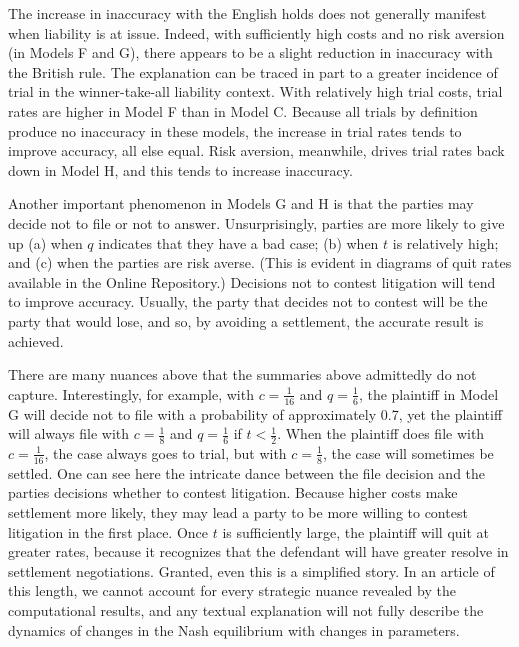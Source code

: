 \documentclass{article}
\begin{document}
The increase in inaccuracy with the English holds does not generally manifest when liability is at issue. Indeed, with sufficiently high costs and no risk aversion (in Models F and G), there appears to be a slight reduction in inaccuracy with the British rule. The explanation can be traced in part to a greater incidence of trial in the winner-take-all liability context. With relatively high trial costs, trial rates are higher in Model F than in Model C.  Because all trials by definition produce no inaccuracy in these models, the increase in trial rates tends to improve accuracy, all else equal. Risk aversion, meanwhile, drives trial rates back down in Model H, and this tends to increase inaccuracy. 

Another important phenomenon in Models G and H is that the parties may decide not to file or not to answer. Unsurprisingly, parties are more likely to give up (a) when $q$ indicates that they have a bad case; (b) when $t$ is relatively high; and (c) when the parties are risk averse. (This is evident in diagrams of quit rates available in the Online Repository.) Decisions not to contest litigation will tend to improve accuracy. Usually, the party that decides not to contest will be the party that would lose, and so, by avoiding a settlement, the accurate result is achieved.

There are many nuances above that the summaries above admittedly do not capture. Interestingly, for example, with $c = \frac{1}{16}$ and $q = \frac{1}{6}$, the plaintiff in Model G will decide not to file with a probability of approximately 0.7, yet the plaintiff will always file with $c = \frac{1}{8}$ and $q = \frac{1}{6}$ if $t < \frac{1}{2}$. When the plaintiff does file with $c = \frac{1}{16}$, the case always goes to trial, but with $c = \frac{1}{8}$, the case will sometimes be settled. One can see here the intricate dance between the file decision and the parties decisions whether to contest litigation. Because higher costs make settlement more likely, they may lead a party to be more willing to contest litigation in the first place. Once $t$ is sufficiently large, the plaintiff will quit at greater rates, because it recognizes that the defendant will have greater resolve in settlement negotiations. Granted, even this is a simplified story. In an article of this length, we cannot account for every strategic nuance revealed by the computational results, and any textual explanation will not fully describe the dynamics of changes in the Nash equilibrium with changes in parameters.
\end{document}
